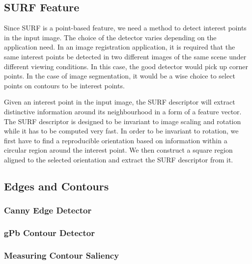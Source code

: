 \documentclass{SMBV12}
\begin{document}
\subsection{SURF Feature}
\label{sec:surf}

Since SURF is a point-based feature, we need a method to detect interest points in the input image. The choice of the detector varies depending on the application need. In an image registration application, it is required that the same interest points be detected in two different images of the same scene under different viewing conditions. In this case, the good detector would pick up corner points. In the case of image segmentation, it would be a wise choice to select points on contours to be interest points.

Given an interest point in the input image, the SURF descriptor will extract distinctive information around its neighbourhood in a form of a feature vector. The SURF descriptor is designed to be invariant to image scaling and rotation while it has to be computed very fast. In order to be invariant to rotation, we first have to find a reproducible orientation based on information within a circular region around the interest point. We then construct a square region aligned to the selected orientation and extract the SURF descriptor from it.

\cite{bay2006surf}

\subsection{Edges and Contours}
\label{sec:shape_feature}

\subsubsection{Canny Edge Detector}

\subsubsection{gPb Contour Detector}

\cite{maire2008using}
\cite{martin2004learning}

\subsubsection{Measuring Contour Saliency}
\end{document}
